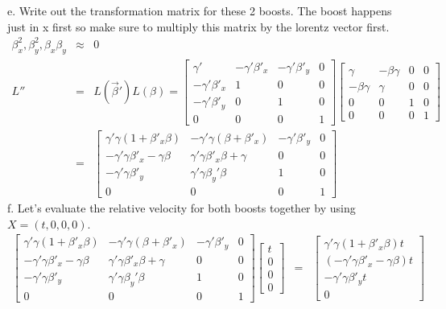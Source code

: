\documentclass[11pt]{amsart}
\begin{document}
e. Write out the transformation matrix for these 2 boosts. The boost happens just in x first so make sure to multiply this matrix by the lorentz vector first. \\
\begin{eqnarray*} 
\beta_{x}^{2}, \beta_{y}^{2}, \beta_{x}\beta_{y} &\approx& 0 \\
L''&=& L(\vec{\beta}')L(\beta) = \begin{bmatrix}
	\gamma' & -\gamma'\beta'_{x} & -\gamma'\beta'_{y} & 0 \\
	-\gamma'\beta'_{x} & 1 & 0 & 0 \\
	-\gamma'\beta'_{y} & 0 & 1 & 0 \\
	0 & 0 & 0 & 1 
	\end{bmatrix}\begin{bmatrix}
	\gamma & -\beta\gamma & 0 & 0 \\
	-\beta\gamma & \gamma & 0 & 0 \\
	0 & 0 & 1 & 0 \\
	0 & 0 & 0 & 1 
	\end{bmatrix} \\
&=& \begin{bmatrix}
	\gamma'\gamma(1+\beta'_{x}\beta) &-\gamma'\gamma(\beta+\beta'_{x}) & -\gamma'\beta'_{y} & 0 \\
	-\gamma'\gamma\beta'_{x}-\gamma\beta & \gamma'\gamma\beta'_{x}\beta+\gamma & 0 & 0 \\
	-\gamma'\gamma\beta'_{y} & \gamma'\gamma\beta_{y}'\beta & 1 & 0 \\
	0 & 0 & 0 & 1 
	\end{bmatrix}
\end{eqnarray*}
f. Let's evaluate the relative velocity for both boosts together by using $X=(t, 0, 0, 0)$. \\
\begin{eqnarray*}
\begin{bmatrix}
	\gamma'\gamma(1+\beta'_{x}\beta) &-\gamma'\gamma(\beta+\beta'_{x}) & -\gamma'\beta'_{y} & 0 \\
	-\gamma'\gamma\beta'_{x}-\gamma\beta & \gamma'\gamma\beta'_{x}\beta+\gamma & 0 & 0 \\
	-\gamma'\gamma\beta'_{y} & \gamma'\gamma\beta_{y}'\beta & 1 & 0 \\
	0 & 0 & 0 & 1 
	\end{bmatrix}\begin{bmatrix}
	t \\
	0 \\
	0 \\
	0 
	\end{bmatrix} &=& \begin{bmatrix}
	\gamma'\gamma(1+\beta'_{x}\beta)t \\
	(-\gamma'\gamma\beta'_{x}-\gamma\beta)t \\
	-\gamma'\gamma\beta'_{y}t \\
	0 
	\end{bmatrix}
	\end{eqnarray*} \\
\end{document}
